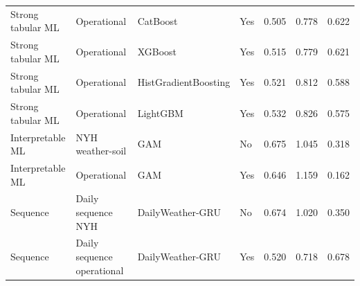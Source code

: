 \begin{longtable}{@{}p{}p{}p{}p{}rrr@{}}
Strong tabular ML & Operational & CatBoost & Yes & 0.505 & 0.778 & 0.622 \\
Strong tabular ML & Operational & XGBoost & Yes & 0.515 & 0.779 & 0.621 \\
Strong tabular ML & Operational & HistGradientBoosting & Yes & 0.521 & 0.812 & 0.588 \\
Strong tabular ML & Operational & LightGBM & Yes & 0.532 & 0.826 & 0.575 \\
Interpretable ML & NYH weather-soil & GAM & No & 0.675 & 1.045 & 0.318 \\
Interpretable ML & Operational & GAM & Yes & 0.646 & 1.159 & 0.162 \\
Sequence & Daily sequence NYH & DailyWeather-GRU & No & 0.674 & 1.020 & 0.350 \\
Sequence & Daily sequence operational & DailyWeather-GRU & Yes & 0.520 & 0.718 & 0.678 \\
\bottomrule
\end{longtable}
\normalsize
